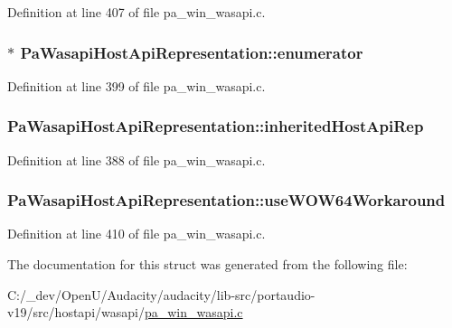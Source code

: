Definition at line 407 of file pa\+\_\+win\+\_\+wasapi.\+c.

\subsubsection[{\texorpdfstring{enumerator}{enumerator}}]{$\ast$ Pa\+Wasapi\+Host\+Api\+Representation\+::enumerator}\hypertarget{struct_pa_wasapi_host_api_representation_a550fc0e31be4a4f1013f921b18469fb8}{}\label{struct_pa_wasapi_host_api_representation_a550fc0e31be4a4f1013f921b18469fb8}


Definition at line 399 of file pa\+\_\+win\+\_\+wasapi.\+c.

\subsubsection[{\texorpdfstring{inherited\+Host\+Api\+Rep}{inheritedHostApiRep}}]{ Pa\+Wasapi\+Host\+Api\+Representation\+::inherited\+Host\+Api\+Rep}\hypertarget{struct_pa_wasapi_host_api_representation_ad447d8ee0d61618450521f7d8204b733}{}\label{struct_pa_wasapi_host_api_representation_ad447d8ee0d61618450521f7d8204b733}


Definition at line 388 of file pa\+\_\+win\+\_\+wasapi.\+c.

\subsubsection[{\texorpdfstring{use\+W\+O\+W64\+Workaround}{useWOW64Workaround}}]{ Pa\+Wasapi\+Host\+Api\+Representation\+::use\+W\+O\+W64\+Workaround}\hypertarget{struct_pa_wasapi_host_api_representation_a1fe6be6a2edf0292a0a3d6f55cf83fc6}{}\label{struct_pa_wasapi_host_api_representation_a1fe6be6a2edf0292a0a3d6f55cf83fc6}


Definition at line 410 of file pa\+\_\+win\+\_\+wasapi.\+c.



The documentation for this struct was generated from the following file\+:\begin{DoxyCompactItemize}
\item 
C\+:/\+\_\+dev/\+Open\+U/\+Audacity/audacity/lib-\/src/portaudio-\/v19/src/hostapi/wasapi/\hyperlink{pa__win__wasapi_8c}{pa\+\_\+win\+\_\+wasapi.\+c}\end{DoxyCompactItemize}

